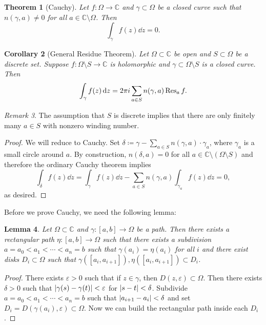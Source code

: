 \documentclass[leqno, openany]{memoir}
\newtheorem{thm}{Theorem}[section]
\newtheorem{cor}[thm]{Corollary}
\newtheorem{lem}[thm]{Lemma}
\theoremstyle{definition}
\theoremstyle{remark}
\newtheorem{rmk}[thm]{Remark}
\theoremstyle{plain}
\theoremstyle{definition}
\theoremstyle{remark}
\newcommand{\C}{\mathbb{C}}
\newcommand{\ep}{\varepsilon}
\begin{document}
\begin{thm}[Cauchy]
    Let $f \colon \Omega \to \C$ and $\gamma \subset \Omega$ be a closed curve such that $n(\gamma, a) \neq 0$ for all $a \in \C \setminus \Omega$. Then
    \[ \int_{\gamma} f(z) \dd{z} = 0. \]
\end{thm}

\begin{cor}[General Residue Theorem]
    Let $\Omega \subset \C$ be open and $S \subset \Omega$ be a discrete set. Suppose $f \colon \Omega \setminus S \to \C$ is holomorphic and $\gamma \subset \Omega \setminus S$ is a closed curve. Then
    \[ \int_{\gamma} f(z) \dd{z} = 2 \pi i \sum_{a \in S} n(\gamma, a) \Res_a f. \]
\end{cor}

\begin{rmk}
    The assumption that $S$ is discrete implies that there are only finitely many $a \in S$ with nonzero winding number.
\end{rmk}

\begin{proof}
    We will reduce to Cauchy. Set $\delta \coloneqq \gamma - \sum_{a \in S} n(\gamma, a) \cdot \gamma_a$, where $\gamma_a$ is a small circle around $a$. By construction, $n(\delta, a) = 0$ for all $a \in \C \setminus (\Omega \setminus S)$ and therefore the ordinary Cauchy theorem implies
    \[ \int_{\delta} f(z) \dd{z} = \int_{\gamma} f(z) \dd{z} - \sum_{a \in S} n(\gamma, a) \int_{\gamma_a} f(z) \dd{z} = 0, \]
    as desired.
\end{proof}

Before we prove Cauchy, we need the following lemma:
\begin{lem}
    Let $\Omega \subset \C$ and $\gamma \colon [a,b] \to \Omega$ be a path. Then there exists a rectangular path $\eta \colon [a,b] \to \Omega$ such that there exists a subdivision $a = a_0 < a_1 < \cdots < a_n = b$ such that $\gamma(a_i) = \eta(a_i)$ for all $i$ and there exist disks $D_i \subset \Omega$ such that $\gamma([a_i, a_{i+1}]), \eta([a_i, a_{i+1}]) \subset D_i$.
\end{lem}

\begin{proof}
    There exists $\ep > 0$ such that if $z \in \gamma$, then $D(z, \ep) \subset \Omega$. Then there exists $\delta > 0$ such that $\abs{\gamma(s) - \gamma(t)} < \ep$ for $\abs{s-t} < \delta$. Subdivide $a = a_0 < a_1 < \cdots < a_n = b$ such that $\abs{a_{i+1} - a_i} < \delta$ and set $D_i = D(\gamma(a_i), \ep) \subset \Omega$. Now we can build the rectangular path inside each $D_i$.
\end{proof}
\end{document}
